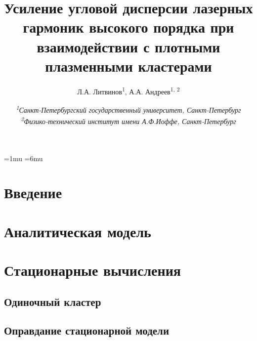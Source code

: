 \documentclass[10pt]{article}
\begin{document}



	\pagestyle{fancy}
	\fancyhf{}
	\fancyhead[L]{\textit{\nouppercase{\leftmark}}}
	\fancyfoot[C]{\thepage}

	\thinmuskip=1mu
	\thickmuskip=6mu
	\def\stacktype{S}\Sstackgap=-4.3pt
	\captionsetup[subfigure]{margin=0.05\textwidth}


	\newcommand{\subfigureautorefname}{\figureautorefname}
	\renewcommand{\thesubfigure}{\asbuk{subfigure}}


	\title{Усиление угловой дисперсии лазерных гармоник высокого порядка при взаимодействии с плотными плазменными кластерами}
	\author{
		Л.А. Литвинов\textsuperscript{1}, А.А. Андреев\textsuperscript{1, 2}
	}
	\date{
		\normalsize{\textit{\textsuperscript{1}Санкт-Петербургский государственный университет, Санкт-Петербург \\ \textsuperscript{2}Физико-технический институт имени А.Ф.Иоффе, Санкт-Петербург}}
	}
	\maketitle

	
	\section{Введение}
	\section{Аналитическая модель}
	\section{Стационарные вычисления}
	\subsection{Одиночный кластер}
	\subsection{Оправдание стационарной модели}
	
	
	

	\clearpage
	
	
\end{document}
